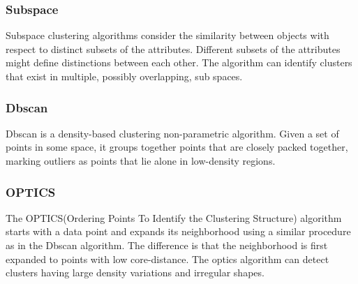 \documentclass[../main]{subfiles}
\begin{document}
\subsubsection{Subspace}
Subspace clustering algorithms consider the similarity between objects with respect to distinct subsets of the attributes\cite{Hartigan1979AlgorithmAlgorithm}. 
Different subsets of the attributes might define distinctions between each other. 
The algorithm can identify clusters that exist in multiple, possibly overlapping, sub spaces\cite{M2016SUBSPACEDATA}.
\subsubsection{Dbscan}
Dbscan is a density-based clustering non-parametric algorithm\cite{Daszykowski2009}.
Given a set of points in some space, it groups together points that are closely packed together, marking outliers as points that lie alone in low-density regions\cite{Daszykowski2009}.
\subsubsection{OPTICS}
The OPTICS(Ordering Points To Identify the Clustering Structure) algorithm starts with a data point and expands its neighborhood using a similar procedure as in the Dbscan algorithm\cite{Ankerst1999OPTICS:Structure}.
The difference is that the neighborhood is first expanded to points with low core-distance\cite{Ankerst1999OPTICS:Structure}. 
The optics algorithm can detect clusters having large density variations and irregular shapes\cite{Ankerst1999OPTICS:Structure}.
\newline 
\end{document}

